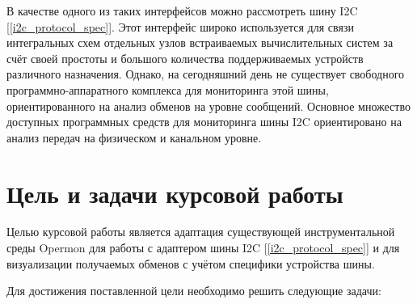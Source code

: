 В качестве одного из таких интерфейсов можно рассмотреть шину I2C [\ref{i2c_protocol_spec}]. Этот интерфейс широко используется для связи интегральных схем отдельных узлов встраиваемых вычислительных систем за счёт своей простоты и большого количества поддерживаемых устройств различного назначения. Однако, на сегодняшний день не существует свободного программно-аппаратного комплекса для мониторинга этой шины, ориентированного на анализ обменов на уровне сообщений. Основное множество доступных программных средств для мониторинга шины I2C ориентировано на анализ передач на физическом и канальном уровне.

\section{Цель и задачи курсовой работы}

Целью курсовой работы является адаптация существующей инструментальной среды Opermon для работы с адаптером шины I2C [\ref{i2c_protocol_spec}] и для визуализации  получаемых обменов с учётом специфики устройства шины.

Для достижения поставленной цели необходимо решить следующие задачи:

